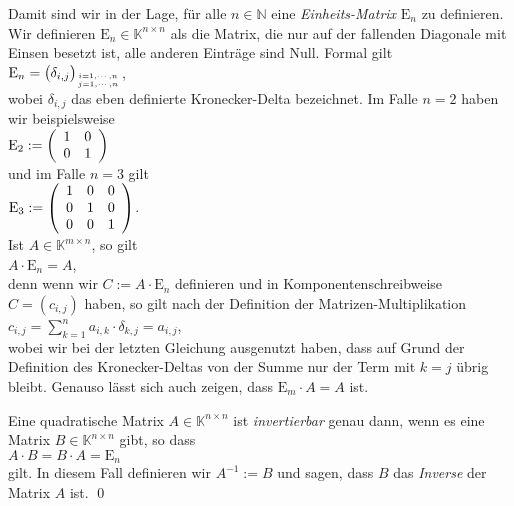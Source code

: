 Damit sind wir in der Lage, f\"{u}r alle $n \in \mathbb{N}$ eine {\emph{\color{blue}Einheits-Matrix}} $\mathrm{E}_n$ zu
definieren.  Wir definieren $\mathrm{E}_n \in \mathbb{K}^{n \times n}$ als die Matrix, die nur auf der
fallenden Diagonale mit Einsen besetzt ist, alle anderen Eintr\"{a}ge sind Null.  Formal
gilt
\\[0.2cm]
\hspace*{1.3cm}
$\mathrm{E}_n = \bigl(\delta_{i,j}\bigr)_{i=1,\cdots,n \atop j=1,\cdots,n}$,
\\[0.2cm]
wobei $\delta_{i,j}$ das eben definierte Kronecker-Delta bezeichnet.  
Im Falle $n = 2$ haben wir beispielsweise
\\[0.2cm]
\hspace*{1.3cm}
$\mathrm{E}_2 := \left(
  \begin{array}[c]{ll}
    1 & 0 \\
    0 & 1 \\
  \end{array}
  \right)
$
\\[0.2cm]
und im Falle $n = 3$ gilt
\\[0.2cm]
\hspace*{1.3cm}
$\mathrm{E}_3 := \left(
  \begin{array}[c]{lll}
    1 & 0 & 0 \\
    0 & 1 & 0 \\
    0 & 0 & 1 \\
  \end{array}
  \right)
$.
\\[0.2cm]
Ist $A \in \mathbb{K}^{m \times n}$,
so gilt
\\[0.2cm]
\hspace*{1.3cm}
$A \cdot \mathrm{E}_n = A$,
\\[0.2cm]
denn wenn wir $C := A \cdot \mathrm{E}_n$ definieren und in Komponentenschreibweise $C = (c_{i,j})$ haben, so
gilt nach der Definition der Matrizen-Multiplikation
\\[0.2cm]
\hspace*{1.3cm}
$c_{i,j} = \sum\limits_{k=1}^n a_{i,k} \cdot \delta_{k,j} = a_{i,j}$,
\\[0.2cm]
wobei wir bei der letzten Gleichung ausgenutzt haben, dass auf Grund der Definition des
Kronecker-Deltas von der Summe nur der Term mit $k = j$ \"{u}brig bleibt.  Genauso l\"{a}sst sich auch
zeigen, dass $\mathrm{E}_m \cdot A = A$ ist.

\begin{Definition}
  Eine quadratische Matrix $A \in \mathbb{K}^{n \times n}$ ist {\emph{\color{blue}invertierbar}} genau dann, wenn
  es eine Matrix $B \in \mathbb{K}^{n \times n}$ gibt, so dass 
  \\[0.2cm]
  \hspace*{1.3cm}
  $A \cdot B = B \cdot A = \mathrm{E}_n$
  \\[0.2cm]
  gilt.  In diesem Fall definieren wir $A^{-1} := B$ und sagen, dass $B$ das {\emph{\color{blue}Inverse}} der
  Matrix $A$ ist.  \qed
\end{Definition}

